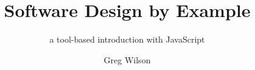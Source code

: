\title{Software Design by Example}
\subtitle{a tool-based introduction with JavaScript}
\author{Greg Wilson}

